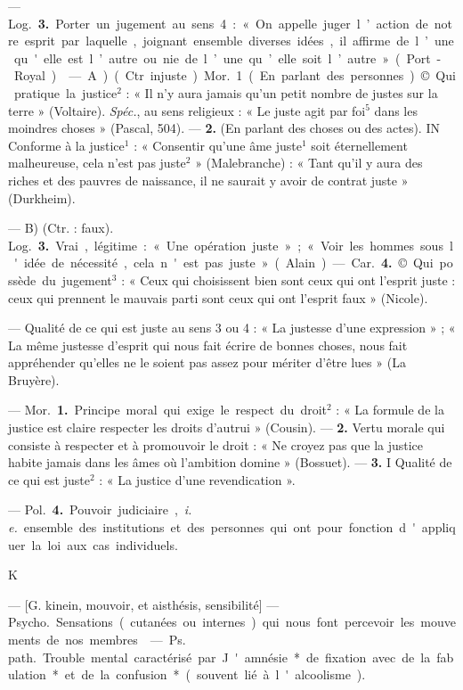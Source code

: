 \begin{itemize}[leftmargin=1cm, label=, itemsep=1pt]
— \si{Log.} {\bf 3.} Porter un jugement
au sens 4 : « On appelle juger l’action
de notre esprit par laquelle, joignant
ensemble diverses idées, il affirme
de l’une qu'elle est l’autre ou nie
de l’une qu’elle soit l’autre » (Port-Royal).

 — A) (Ctr.
injuste). \si{Mor.}
1. (En parlant des personnes). © Qui
pratique la justice$^2$ : « Il n’y aura
jamais qu’un petit nombre de justes
sur la terre » (Voltaire). {\it Spéc.}, au
sens religieux : « Le juste agit par
foi$^5$ dans les moindres choses »
(Pascal, 504). — {\bf 2.} (En parlant des
choses ou des actes). IN Conforme à la
justice$^1$ : « Consentir qu’une âme
juste$^1$ soit éternellement malheureuse, cela n’est pas juste$^2$ » (Malebranche)
: « Tant qu'il y aura des
riches et des pauvres de naissance,
il ne saurait y avoir de contrat
juste » (Durkheim).

— B) (Ctr. : faux). \si{Log.} {\bf 3.} Vrai,
légitime : « Une opération juste » ;
« Voir les hommes sous l'idée de
nécessité, cela n'est pas juste »
(Alain). — \si{Car.} {\bf 4.} © Qui possède du
jugement$^3$ : « Ceux qui choisissent
bien sont ceux qui ont l'esprit juste :
ceux qui prennent le mauvais parti
sont ceux qui ont l'esprit faux »
(Nicole).

 — Qualité de ce qui est juste
au sens 3 ou 4 : « La justesse d’une
expression » ; « La même justesse
d'esprit qui nous fait écrire de
bonnes choses, nous fait appréhender
qu'elles ne le soient pas assez pour
mériter d’être lues » (La Bruyère).

 — \si{Mor.} {\bf 1.} Principe moral qui
exige le respect du droit$^2$ : « La
formule de la justice est claire
respecter les droits d’autrui » (Cousin). — {\bf 2.} Vertu morale qui consiste
à respecter et à promouvoir le droit :
« Ne croyez pas que la justice habite
jamais dans les âmes où l'ambition
domine » (Bossuet). — {\bf 3.} I Qualité
de ce qui est juste$^2$ : « La justice
d’une revendication ».

— \si{Pol.} {\bf 4.} Pouvoir judiciaire,
{\it i. e.} ensemble des institutions et des
personnes qui ont pour fonction
d'appliquer la loi aux cas individuels.

\begin{center}
K
\end{center}

 — [G. kinein, mouvoir, et
aisthésis, sensibilité] — \si{Psycho.}
Sensations (cutanées ou internes)
qui nous font percevoir les mouvements de nos membres.

 — \si{Ps. path.}
Trouble mental caractérisé par
J'amnésie* de fixation avec de la
fabulation* et de la confusion*
(souvent lié à l'alcoolisme).

	\end{itemize}
